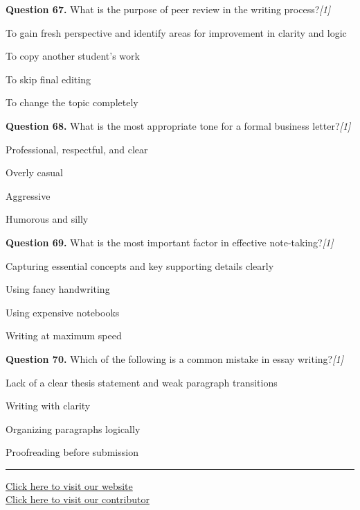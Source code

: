 \documentclass[11pt,a4paper]{article}
\newcommand{\pts}[1]{\hfill   \textit{[#1]}}
\begin{document}
\medskip




\noindent   \textbf{Question 67.} What is the purpose of peer review in the writing process?\pts{1}

\begin{parts}
  \item To gain fresh perspective and identify areas for improvement in clarity and logic
  \item To copy another student's work
  \item To skip final editing
  \item To change the topic completely
\end{parts}

\medskip




\noindent   \textbf{Question 68.} What is the most appropriate tone for a formal business letter?\pts{1}

\begin{parts}
  \item Professional, respectful, and clear
  \item Overly casual
  \item Aggressive
  \item Humorous and silly
\end{parts}

\medskip




\noindent   \textbf{Question 69.} What is the most important factor in effective note-taking?\pts{1}

\begin{parts}
  \item Capturing essential concepts and key supporting details clearly
  \item Using fancy handwriting
  \item Using expensive notebooks
  \item Writing at maximum speed
\end{parts}

\medskip




\noindent   \textbf{Question 70.} Which of the following is a common mistake in essay writing?\pts{1}

\begin{parts}
  \item Lack of a clear thesis statement and weak paragraph transitions
  \item Writing with clarity
  \item Organizing paragraphs logically
  \item Proofreading before submission
\end{parts}

\vfill
\rule{\linewidth}{0.4pt}

\begin{center}\small
\href{https://bhu-exam.vercel.app/}{Click here to visit our website}\\[4pt]
\href{https://me-aryan.vercel.app/}{Click here to visit our contributor}
\end{center}
\end{document}
